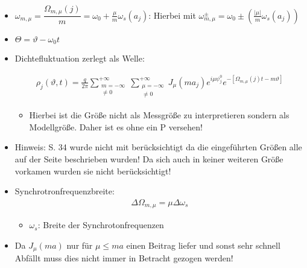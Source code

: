 \documentclass[12pt]{article}%
\renewcommand{\theta}{\vartheta}
\begin{document}
\begin{itemize}
	\item $\omega_{m,\mu} = \dfrac{\Omega_{m,\mu}(j)}{m} = \omega_0 + \frac{\mu}{m} \omega_s(a_j)$:
	Hierbei mit $\omega_{m,\mu}^{\pm}= \omega_0 \pm (\frac{|\mu|}{m}\omega_s(a_j))$  
	
	\item $\Theta = \theta - \omega_0 t$
	
\end{itemize}


\begin{itemize}
	\item Dichtefluktuation zerlegt als Welle:
	
		\begin{align}
		\rho_j(\theta,t) = \frac{q}{2\pi} \sum_{\substack{m = -\infty \\ \neq 0}}^{+\infty} \sum_{\substack{\mu = -\infty\\ \neq 0}}^{+\infty} J_{\mu}(ma_j)e^{i\mu \psi_j^0}e^{-[\Omega_{m,\mu}(j)t-m\theta]}
		\end{align}
		\begin{itemize}
			
	\item  Hierbei ist die Größe nicht als Messgröße zu interpretieren sondern als Modellgröße. Daher ist es ohne ein P versehen!
	
	
	\end{itemize} 
\end{itemize}


\begin{itemize}
	\item Hinweis: S. 34 wurde nicht mit berücksichtigt da die eingeführten Größen alle auf der Seite beschrieben wurden! Da sich auch in keiner weiteren Größe vorkamen wurden sie nicht berücksichtigt!
	
	\item Synchrotronfrequenzbreite: 
	\begin{align}
		\Delta \Omega_{m,\mu}=\mu\Delta\omega_s
	\end{align}

	\begin{itemize}
		\item $\omega_s$: Breite der Synchrotonfrequenzen
	\end{itemize}
	
	\item Da $J_{\mu}(ma)$ nur für $\mu \leq ma $ einen Beitrag liefer und sonst sehr schnell Abfällt muss dies nicht immer in Betracht gezogen werden! 
\end{itemize}
\end{document}
